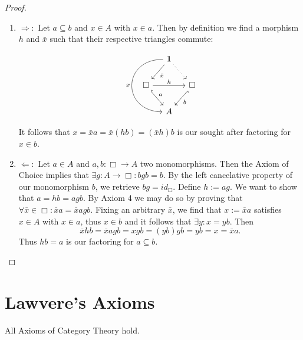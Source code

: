 \begin{proof}
\begin{enumerate} 
\item $\Rightarrow :$ Let $a \subseteq b$ and $x \in A$ with $x \in a$. Then by definition we find a morphism $h$ and $\bar{x}$ such that their respective triangles commute:

\begin{equation}
\begin{tikzcd}[column sep=small]
& \mathbf{1} \arrow[dl, "\bar{x}"] \arrow[dr, dotted] \arrow[dd, "x", bend right=90,looseness=2,swap]& \\
\Box \arrow[rr, "h"] \arrow[dr, "a", hook] &     & \Box \arrow[dl, "b", hook] \\
& A
\end{tikzcd}
\end{equation} \newline

It follows that $x = \bar{x}a = \bar{x}(hb) = (\bar{x}h)b$ is our sought after factoring for $x \in b$.

\item $\Leftarrow :$ Let $a \in A$ and $a,b: \Box \longrightarrow A$ two monomorphisms. Then the Axiom of Choice implies that $\exists g: A \longrightarrow \Box : bgb = b$. By the left cancelative property of our monomorphism $b$, we retrieve $bg = id_\Box$. Define $h := ag$. We want to show that $a = hb = agb$. By Axiom 4 we may do so by proving that $\forall \bar{x} \in \Box: \bar{x}a = \bar{x}agb$. Fixing an arbitrary $\bar{x}$, we find that $x := \bar{x}a$ satisfies $x \in A$ with $x \in a$, thus $x \in b$ and it follows that $\exists y : x = yb$. Then
\begin{equation*}
\bar{x}hb = \bar{x}agb = xgb = (yb)gb = yb = x = \bar{x}a.
\end{equation*}
Thus $hb = a$ is our factoring for $a \subseteq b$. 
\end{enumerate}
\end{proof}





\clearpage

\section{Lawvere's Axioms}

\setcounter{axiom}{0}

\begin{axiom}
All Axioms of Category Theory hold.
\end{axiom}


